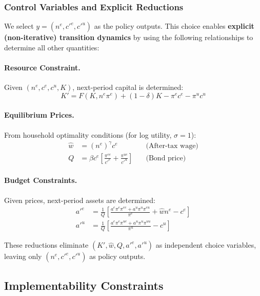 \subsubsection{Control Variables and Explicit Reductions}
We select $y = (n^e, c'^e, c'^u)$ as the policy outputs. This choice enables \textbf{explicit (non-iterative) transition dynamics} by using the following relationships to determine all other quantities:

\paragraph{Resource Constraint.}
Given $(n^e, c^e, c^u, K)$, next-period capital is determined:
\begin{equation}\label{eq:resource_ha}
    K' = F(K, n^e \pi^e) + (1-\delta)K - \pi^e c^e - \pi^u c^u
\end{equation}

\paragraph{Equilibrium Prices.}
From household optimality conditions (for log utility, $\sigma = 1$):
\begin{align}
    \hat{w} &= (n^e)^\gamma c^e \quad &\text{(After-tax wage)} \label{eq:wage_ha}\\
    Q &= \beta c^e \left[ \frac{\pi^{ee}}{c'^e} + \frac{\pi^{ue}}{c'^u} \right] \quad &\text{(Bond price)} \label{eq:bondprice_ha}
\end{align}

\paragraph{Budget Constraints.}
Given prices, next-period assets are determined:
\begin{align}
    a'^e &= \frac{1}{Q} \left[ \frac{a^e \pi^e \pi^{ee} + a^u \pi^u \pi^{eu}}{\pi^e} + \hat{w} n^e - c^e \right] \label{eq:asset_e}\\
    a'^u &= \frac{1}{Q} \left[ \frac{a^e \pi^e \pi^{ue} + a^u \pi^u \pi^{uu}}{\pi^u} - c^u \right] \label{eq:asset_u}
\end{align}

These reductions eliminate $(K', \hat{w}, Q, a'^e, a'^u)$ as independent choice variables, leaving only $(n^e, c'^e, c'^u)$ as policy outputs.


\subsection{Implementability Constraints}

